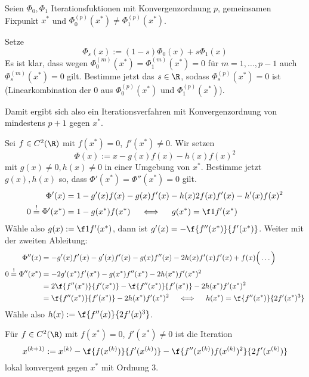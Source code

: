 \documentclass[11pt]{scrbook}
\begin{document}
\begin{seg}
	Seien $\Phi_0, \Phi_1$ Iterationsfuktionen mit Konvergenzordnung $p$, gemeinsamen Fixpunkt $x^*$ und $\Phi_0^{(p)}(x^*) \neq \Phi_1^{(p)}(x^*)$.

	Setze
	\[
		\Phi_s(x) := (1-s)\Phi_0(x) + s\Phi_1(x)
	\]
	Es ist klar, dass wegen $\Phi_0^{(m)}(x^*) = \Phi_1^{(m)}(x^*) = 0$ für $m=1,\dotsc,p-1$ auch $\Phi_s^{(m)}(x^*) = 0$ gilt.
	Bestimme jetzt das $s\in \R$, sodass $\Phi_s^{(p)}(x^*) = 0$ ist (Linearkombination der $0$ aus $\Phi_0^{(p)}(x^*)$ und $\Phi_1^{(p)}(x^*)$).

	Damit ergibt sich also ein Iterationsverfahren mit Konvergenzordnung von mindestens $p+1$ gegen $x^*$.
\end{seg}
\begin{seg}
	Sei $f\in C^2(\R)$ mit $f(x^*) = 0$, $f'(x^*) \neq 0$.
	Wir setzen
	\[
		\Phi(x) := x - g(x) f(x) - h(x) f(x)^2
	\]
	mit $g(x) \neq 0, h(x) \neq 0$ in einer Umgebung von $x^*$.
	Bestimme jetzt $g(x),h(x)$ so, dass $\Phi'(x^*) = \Phi''(x^*) = 0$ gilt.
	\begin{align*}
		\Phi'(x) &= 1 - g'(x)f(x) - g(x)f'(x) - h(x)2f(x)f'(x) -h'(x)f(x)^2 \\
		0 \stackrel != \Phi'(x^*) &= 1 -g(x^*)f(x^*) \quad\iff\quad g(x^*) = \f 1{f'(x^*)}
	\end{align*}
	Wähle also $g(x) := \f 1{f'(x^*)}$, dann ist $g'(x) = - \f {f''(x^*)}{f'(x^*)}$.
	Weiter mit der zweiten Ableitung:
	\begin{align*}
		\Phi''(x) &= -g'(x)f'(x) -g'(x)f'(x) - g(x)f''(x) - 2h(x)f'(x)f'(x) + f(x)\Big( \dotso \Big) \\
		0 \stackrel != \Phi''(x^*) &= -2g'(x^*)f'(x^*) -g(x^*)f''(x^*) - 2h(x^*)f'(x^*)^2 \\
		&= 2 \f {f''(x^*)}{f'(x^*)} - \f {f''(x^*)}{f'(x^*)} - 2h(x^*) f'(x^*)^2 \\
		&= \f {f''(x^*)}{f'(x^*)} - 2h(x^*) f'(x^*)^2 
		\quad\iff\quad h(x^*) = \f {f''(x^*)}{2f'(x^*)^3}
	\end{align*}
	Wähle also $h(x) := \f {f''(x)}{2f'(x)^3}$.
\end{seg}

\begin{kor} \label{3.13}
	Für $f\in C^2(\R)$ mit $f(x^*)=0$, $f'(x^*) \neq 0$ ist die Iteration
	\[
		x^{(k+1)} := x^{(k)} - \f {f(x^{(k)})}{f'(x^{(k)})} - \f {f''(x^{(k)})f(x^{(k)})^2}{2f'(x^{(k)})}
	\]
	lokal konvergent gegen $x^*$ mit Ordnung $3$.
\end{kor}
\end{document}
